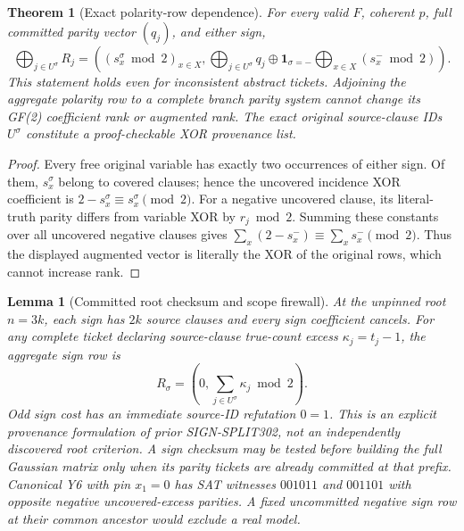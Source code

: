 \documentclass[11pt]{article}
\newtheorem{theorem}{Theorem}
\newtheorem{lemma}{Lemma}
\begin{document}
\begin{theorem}[Exact polarity-row dependence]
For every valid $F$, coherent $p$, full committed parity vector $(q_j)$, and either sign,
\[
\boxed{\bigoplus_{j\in U^\sigma}R_j =
((s_x^\sigma\bmod2)_{x\in X},
\bigoplus_{j\in U^\sigma}q_j
\oplus\mathbf1_{\sigma=-}\bigoplus_{x\in X}(s_x^-\bmod2)).}
\]
This statement holds even for inconsistent abstract tickets. Adjoining the aggregate polarity row to a \emph{complete} branch parity system cannot change its GF(2) coefficient rank or augmented rank. The exact original source-clause IDs $U^\sigma$ constitute a proof-checkable XOR provenance list.
\end{theorem}
\begin{proof}
Every free original variable has exactly two occurrences of either sign. Of them, $s_x^\sigma$ belong to covered clauses; hence the uncovered incidence XOR coefficient is $2-s_x^\sigma\equiv s_x^\sigma\pmod2$. For a negative uncovered clause, its literal-truth parity differs from variable XOR by $r_j\bmod2$. Summing these constants over all uncovered negative clauses gives $\sum_x(2-s_x^-)\equiv\sum_xs_x^-\pmod2$. Thus the displayed augmented vector is literally the XOR of the original rows, which cannot increase rank.
\end{proof}
\begin{lemma}[Committed root checksum and scope firewall]
At the unpinned root $n=3k$, each sign has $2k$ source clauses and every sign coefficient cancels. For any complete ticket declaring source-clause true-count excess $\kappa_j=t_j-1$, the aggregate sign row is
\[
 R_\sigma=(0,\sum_{j\in U^\sigma}\kappa_j\bmod2).
\]
Odd sign cost has an immediate source-ID refutation $0=1$. This is an explicit provenance formulation of prior SIGN-SPLIT302, not an independently discovered root criterion. A sign checksum may be tested before building the full Gaussian matrix only when its parity tickets are already committed at that prefix. Canonical Y6 with pin $x_1=0$ has SAT witnesses $001011$ and $001101$ with opposite negative uncovered-excess parities. A fixed uncommitted negative sign row at their common ancestor would exclude a real model.
\end{lemma}
\end{document}

